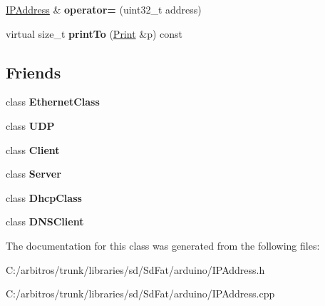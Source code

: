 \begin{DoxyCompactItemize}
\item 
\hypertarget{class_i_p_address_a1485e06a1694bc174704c61e0d44e52f}{\hyperlink{class_i_p_address}{I\-P\-Address} \& {\bfseries operator=} (uint32\-\_\-t address)}\label{class_i_p_address_a1485e06a1694bc174704c61e0d44e52f}

\item 
\hypertarget{class_i_p_address_a4de4b3920775530f38f756b2177a9bca}{virtual size\-\_\-t {\bfseries print\-To} (\hyperlink{class_print}{Print} \&p) const }\label{class_i_p_address_a4de4b3920775530f38f756b2177a9bca}

\end{DoxyCompactItemize}
\subsection*{Friends}
\begin{DoxyCompactItemize}
\item 
\hypertarget{class_i_p_address_a9a150ffc237e50529b3d0d50cc83a4d7}{class {\bfseries Ethernet\-Class}}\label{class_i_p_address_a9a150ffc237e50529b3d0d50cc83a4d7}

\item 
\hypertarget{class_i_p_address_a480cf93423716d22666c9c3f17177736}{class {\bfseries U\-D\-P}}\label{class_i_p_address_a480cf93423716d22666c9c3f17177736}

\item 
\hypertarget{class_i_p_address_a5db1c99e2c94b26278f3838c85cdb618}{class {\bfseries Client}}\label{class_i_p_address_a5db1c99e2c94b26278f3838c85cdb618}

\item 
\hypertarget{class_i_p_address_ac2055578ac48afabe5af487878450f68}{class {\bfseries Server}}\label{class_i_p_address_ac2055578ac48afabe5af487878450f68}

\item 
\hypertarget{class_i_p_address_afef6ad9b691e32ea60d87db719e23e15}{class {\bfseries Dhcp\-Class}}\label{class_i_p_address_afef6ad9b691e32ea60d87db719e23e15}

\item 
\hypertarget{class_i_p_address_a14acdf960f52e4a43740d57e81a27c40}{class {\bfseries D\-N\-S\-Client}}\label{class_i_p_address_a14acdf960f52e4a43740d57e81a27c40}

\end{DoxyCompactItemize}


The documentation for this class was generated from the following files\-:\begin{DoxyCompactItemize}
\item 
C\-:/arbitros/trunk/libraries/sd/\-Sd\-Fat/arduino/I\-P\-Address.\-h\item 
C\-:/arbitros/trunk/libraries/sd/\-Sd\-Fat/arduino/I\-P\-Address.\-cpp\end{DoxyCompactItemize}
